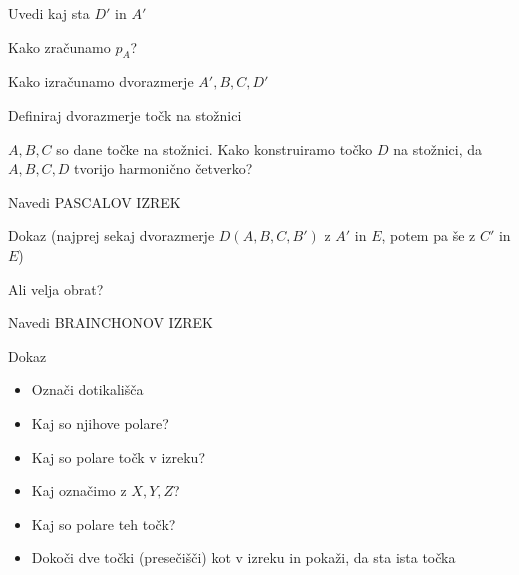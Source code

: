 \documentclass{article}
\begin{document}
\begin{enumerate}
\begin{itemize}
            {\color{red}\item Uvedi kaj sta $D'$ in $A'$}
            {\color{red}\item Kako zračunamo $p_A$?}
            \item Kako izračunamo dvorazmerje $A', B, C, D'$
        \end{itemize}
        \item Definiraj dvorazmerje točk na stožnici
        \item $A, B, C$ so dane točke na stožnici. Kako konstruiramo točko $D$ na stožnici, da $A, B, C, D$ tvorijo harmonično četverko?
        \item Navedi PASCALOV IZREK
        {\color{red}\item Dokaz (najprej sekaj dvorazmerje $D(A, B, C, B')$ z $A'$ in $E$, potem pa še z $C'$ in $E$)}
        \item Ali velja obrat?
        \item Navedi BRAINCHONOV IZREK
        \item Dokaz
        \begin{itemize}
            \item Označi dotikališča
            \item Kaj so njihove polare?
            \item Kaj so polare točk v izreku?
            \item Kaj označimo z $X, Y, Z$?
            \item Kaj so polare teh točk?
            \item Dokoči dve točki (presečišči) kot v izreku in pokaži, da sta ista točka
        \end{itemize}
    \end{enumerate}
\end{document}
